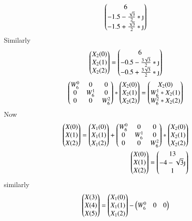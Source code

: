 \documentclass[journal,12pt,twocolumn]{IEEEtran}
\renewcommand\thesection{\arabic{section}}
\begin{document}
\begin{enumerate}[label=\thesection.\arabic*]
\begin{equation}
			\myvec{
				6 \\
				-1.5 - \frac{\sqrt{3}}{2}*\text{\j}\\
				-1.5 + \frac{\sqrt{3}}{2}*\text{\j}
			}
		\end{equation}
		Similarly
		\begin{equation}
			\myvec{X_{2}(0)\\ X_{2}(1)\\ X_{2}(2)} = 
			\myvec{
				6 \\
				-0.5 - \frac{3\sqrt{3}}{2}*\text{\j}\\
				-0.5 + \frac{3\sqrt{3}}{2}*\text{\j}
			}
		\end{equation}
		\begin{equation}
			\begin{pmatrix}
				W^{0}_{6} & 0 & 0\\ 
				0 & W^{1}_{6} & 0\\ 
				0 & 0 & W^{2}_{6}\\ 
			\end{pmatrix}
			*
			\begin{pmatrix}X_{2}(0)\\ X_{2}(1)\\ X_{2}(2)\end{pmatrix} = 
			\begin{pmatrix}X_{2}(0)\\ W^{1}_{6}*X_{2}(1)\\ W^{2}_{6}*X_{2}(2)\end{pmatrix}
		\end{equation}
		Now 
		\begin{align}
			\myvec{X(0) \\ X(1) \\ X(2)} = 
			\myvec{X_{1}(0)\\ X_{1}(1)\\ X_{1}(2)} +
			\myvec{
				W^{0}_{6} & 0 & 0\\ 
				0 & W^{1}_{6} & 0\\ 
				0 & 0 & W^{2}_{6}\\ 
			}
			*
			\myvec{X_{2}(0)\\ X_{2}(1)\\ X_{2}(2)}\\
			\myvec{X(0) \\ X(1) \\ X(2)} = 
			\myvec{
				13\\
				-4-\sqrt{3}\text{\j} \\
				1
			}
		\end{align}
		similarly 
		\begin{align}
			\begin{pmatrix}X(3) \\ X(4) \\ X(5)\end{pmatrix} = 
			\begin{pmatrix}X_{1}(0)\\ X_{1}(1)\\ X_{1}(2)\end{pmatrix} -
			\begin{pmatrix}
				W^{0}_{6} & 0 & 0\\ 
\end{pmatrix}
\end{align}
\end{enumerate}
\end{document}
